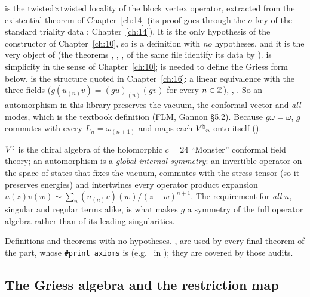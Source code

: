 \begin{dictionary}
 is the twisted$\times$twisted locality of the block vertex operator, extracted from the
existential theorem  of Chapter~\ref{ch:14} (its proof goes through the $\sigma$-key
 of the standard triality data ; Chapter~\ref{ch:14}).  It is the only hypothesis of
the constructor  of Chapter~\ref{ch:10}, so  is a definition with \emph{no} hypotheses,
and it is the very object of  (the theorems , ,
,  of the same file identify its data by ).
 is simplicity in the sense of Chapter~\ref{ch:10};  is needed to
define the Griess form below.   is the structure  quoted in Chapter~\ref{ch:16}: a
linear equivalence with the three fields  ($g(u_{(n)}v)=(gu)_{(n)}(gv)$ for every $n\in{\mathbb{Z}}$),
, .  So an automorphism in this library preserves the vacuum, the conformal vector and
\emph{all} modes, which is the textbook definition (FLM, Gannon \S5.2).  Because $g\omega=\omega$, $g$ commutes
with every $L_n=\omega_{(n+1)}$ and maps each ${V^{\natural}}_n$ onto itself ().
\end{dictionary}
\begin{physics}
${V^{\natural}}$ is the chiral algebra of the holomorphic $c=24$ ``Monster'' conformal field theory; an automorphism is a
\emph{global internal symmetry}: an invertible operator on the space of states that fixes the vacuum, commutes with
the stress tensor (so it preserves energies) and intertwines every operator product expansion
$u(z)v(w)\sim\sum_n (u_{(n)}v)(w)/(z-w)^{n+1}$.  The requirement for \emph{all} $n$, singular and regular terms alike,
is what makes $g$ a symmetry of the full operator algebra rather than of its leading singularities.
\end{physics}
\begin{status}
Definitions and theorems with no hypotheses.  ,  are used by every final theorem of the
part, whose \texttt{\#print axioms} is  (e.g.\  in
); they are covered by those audits.
\end{status}

\subsection{The Griess algebra and the restriction map}

